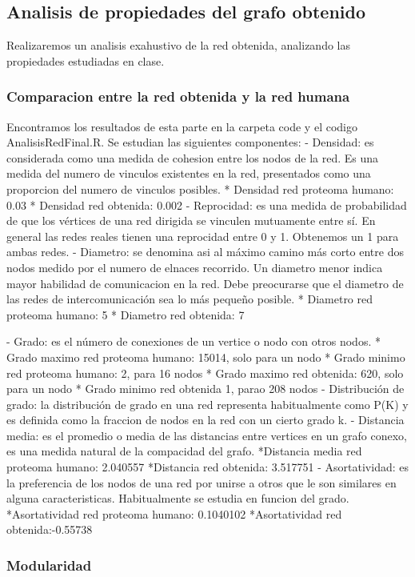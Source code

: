 \subsection{Analisis de propiedades del grafo obtenido}
Realizaremos un analisis exahustivo de la red obtenida, analizando las propiedades estudiadas en clase.

\subsubsection{Comparacion entre la red obtenida y la red humana}
Encontramos los resultados de esta parte en la carpeta code y el codigo AnalisisRedFinal.R. Se estudian las siguientes componentes:
- Densidad: es considerada como una medida de cohesion entre los nodos de la red. Es una medida del numero de vinculos existentes en la red, presentados como una proporcion del numero de vinculos posibles. 
  * Densidad red proteoma humano: 0.03
  * Densidad red obtenida: 0.002
- Reprocidad: es una medida de probabilidad de que los vértices de una red dirigida se vinculen mutuamente entre sí. En general las redes reales tienen una reprocidad entre 0 y 1. Obtenemos un 1 para ambas redes.
- Diametro: se denomina asi al máximo camino más corto entre dos nodos medido por el numero de elnaces recorrido. Un diametro menor indica mayor habilidad de comunicacion en la red. Debe preocurarse que el diametro de las redes de intercomunicación sea lo más pequeño posible. 
  * Diametro red proteoma humano: 5
  * Diametro red obtenida: 7

- Grado: es el número de conexiones de un vertice o nodo con otros nodos. 
  * Grado maximo red proteoma humano: 15014, solo para un nodo
  * Grado minimo red proteoma humano: 2, para 16 nodos
  * Grado maximo red obtenida: 620, solo para un nodo
  * Grado minimo red obtenida 1, parao 208 nodos
- Distribución de grado: la distribución de grado en una red representa habitualmente como P(K) y es definida como la fraccion de nodos en la red con un cierto grado k. 
- Distancia media: es el promedio o media de las distancias entre vertices en un grafo conexo, es una medida natural de la compacidad del grafo. 
  *Distancia media red proteoma humano: 2.040557
  *Distancia red obtenida: 3.517751
- Asortatividad: es la preferencia de los nodos de una red por unirse a otros que le son similares en alguna caracteristicas. Habitualmente se estudia en funcion del grado.
  *Asortatividad red proteoma humano: 0.1040102
  *Asortatividad red obtenida:-0.55738

\subsubsection{Modularidad}

